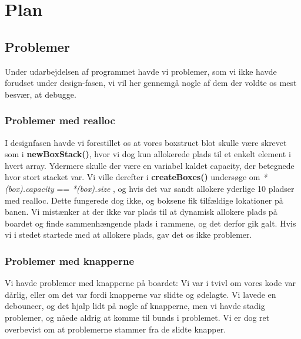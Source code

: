 \section{Plan}

\subsection{Problemer}
Under udarbejdelsen af programmet havde vi problemer, som vi ikke havde forudset under design-fasen, vi vil her gennemgå nogle af dem der voldte os mest besvær, at debugge.
\subsubsection{Problemer med realloc}
\label{reallocfejl}
I designfasen havde vi forestillet os at vores boxstruct blot skulle være skrevet som i \textbf{newBoxStack()}, hvor vi dog kun allokerede plads til et enkelt element i hvert array. Ydermere skulle der være en variabel kaldet capacity, der betegnede hvor stort stacket var. Vi ville derefter i \textbf{createBoxes()} undersøge om \textit{*(box).capacity} == \textit{*(box).size} , og hvis det var sandt allokere yderlige 10 pladser med realloc. Dette fungerede dog ikke, og boksene fik tilfældige lokationer på banen. Vi mistænker at der ikke var plads til at dynamisk allokere plads på boardet og finde sammenhængende plads i rammene, og det derfor gik galt. Hvis vi i stedet startede med at allokere plads, gav det os ikke problemer.
\subsubsection{Problemer med knapperne}
Vi havde problemer med knapperne på boardet: Vi var i tvivl om vores kode var dårlig, eller om det var fordi knapperne var slidte og ødelagte. Vi lavede en debouncer, og det hjalp lidt på nogle af knapperne, men vi havde stadig problemer, og nåede aldrig at komme til bunds i problemet. Vi er dog ret overbevist om at problemerne stammer fra de slidte knapper.



